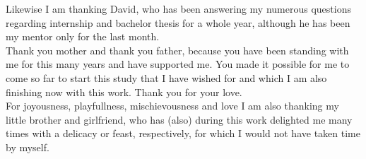 \noindent
Likewise I am thanking David, who has been answering my numerous questions regarding internship and bachelor thesis for a whole year, although he has been my mentor only for the last month. \\

\noindent
Thank you mother and thank you father, because you have been standing with me for this many years and have supported me. You made it possible for me to come so far to start this study that I have wished for and which I am also finishing now with this work. Thank you for your love. \\

\noindent
For joyousness, playfullness, mischievousness and love I am also thanking my little brother and girlfriend, who has (also) during this work delighted me many times with a delicacy or feast, respectively, for which I would not have taken time by myself.

\vfil

